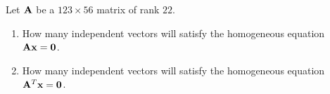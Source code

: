 \begin{problem}{\problemnum}
Let $\mathbf{A}$ be a $123 \times 56$ matrix of rank $22$.
\begin{enumerate}
    \item How many independent vectors will satisfy the homogeneous equation $\mathbf{A}\mathbf{x}=\mathbf{0}$.
    \item How many independent vectors will satisfy the homogeneous equation $\mathbf{A}^{T}\mathbf{x}=\mathbf{0}$.
\end{enumerate}
\end{problem}
